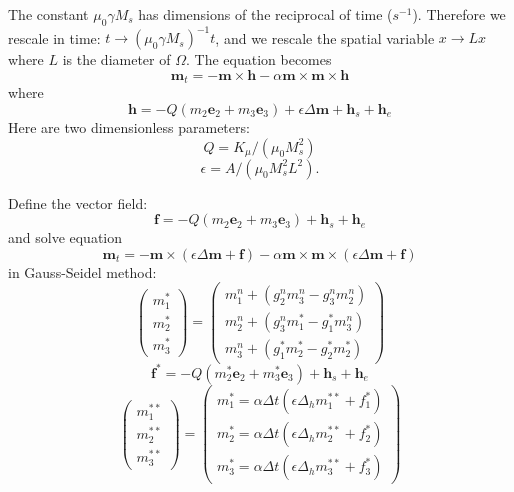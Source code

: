 \documentclass{article}
\begin{document}
The constant $\mu_0\gamma M_s$ has dimensions of the reciprocal of time ($s^{-1}$). Therefore we rescale in time: $t \to \left(\mu_0\gamma M_s\right)^{-1}t$, and we rescale the spatial variable $x\to Lx$ where $L$ is the diameter of $\Omega$. The equation becomes
\begin{equation}
\bm{m}_t=-\bm{m}\times\bm{h}-\alpha \bm{m}\times\bm{m}\times\bm{h}
\end{equation}
where
\begin{equation}
\bm{h}=-Q\left(m_2\bm{e}_2+m_3\bm{e}_3\right)+\epsilon \Delta \bm{m} +\bm{h}_s+\bm{h}_e
\end{equation}
Here are two dimensionless parameters:
\[Q=K_{\mu}/\left(\mu_0M_s^2\right)\]\[\epsilon=A/\left(\mu_0 M_s^2L^2\right).\]

Define the vector field:
\begin{equation}
\bm{f}=-Q\left(m_2\bm{e}_2+m_3\bm{e}_3\right)+\bm{h}_s+\bm{h}_e
\end{equation}
and solve equation
\begin{equation}
\bm{m}_t=-\bm{m}\times\left(\epsilon \Delta \bm{m}+\bm{f}\right)-\alpha\bm{m}\times\bm{m}\times\left(\epsilon\Delta \bm{m}+\bm{f}\right)
\end{equation}
in Gauss-Seidel method:
\begin{equation}
\left(\begin{array}{c}
m_1^* \\ 
m_2^* \\ 
m_3^*
\end{array} \right)=\left(\begin{array}{c}
m_1^n+\left(g_2^n m_3^n-g_3^n m_2^n\right) \\ 
m_2^n+\left(g_3^n m_1^*-g_1^* m_3^n\right) \\ 
m_3^n+\left(g_1^* m_2^*-g_2^* m_2^*\right)
\end{array} \right)
\end{equation}
\begin{equation}
\bm{f}^*=-Q\left(m_2^*\bm{e}_2+m_3^*\bm{e}_3\right)+\bm{h}_s+\bm{h}_e
\end{equation}
\begin{equation}
\left(\begin{array}{c}
m_1^{**} \\ 
m_2^{**} \\ 
m_3^{**}
\end{array} \right)=\left(\begin{array}{c}
m_1^*=\alpha\Delta t\left(\epsilon\Delta_h m_1^{**}+f_1^*\right) \\ 
m_2^*=\alpha\Delta t\left(\epsilon\Delta_h m_2^{**}+f_2^*\right) \\ 
m_3^*=\alpha\Delta t\left(\epsilon\Delta_h m_3^{**}+f_3^*\right)
\end{array} \right)
\end{equation}
\end{document}
